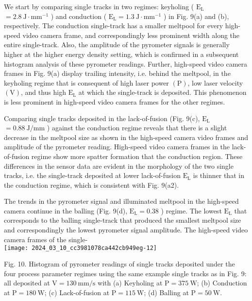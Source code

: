 \documentclass[10pt]{article}
\begin{document}
We start by comparing single tracks in two regimes: keyholing ( $\mathrm{E}_{\mathrm{L}}$ $=2.8 \mathrm{~J} \cdot \mathrm{mm}^{-1}$ ) and conduction ( $\mathrm{E}_{\mathrm{L}}=1.3 \mathrm{~J} \cdot \mathrm{mm}^{-1}$ ) in Fig. 9(a) and (b), respectively. The conduction single-track has a smaller meltpool for every high-speed video camera frame, and correspondingly less prominent width along the entire single-track. Also, the amplitude of the pyrometer signals is generally higher at the higher energy density setting, which is confirmed in a subsequent histogram analysis of these pyrometer readings. Further, high-speed video camera frames in Fig. 9(a) display trailing intensity, i.e. behind the meltpool, in the keyholing regime that is consequent of high laser power $(\mathrm{P})$, low laser velocity $(\mathrm{V})$, and thus high $\mathrm{E}_{\mathrm{L}}$ at which the single-track is deposited. This phenomenon is less prominent in high-speed video camera frames for the other regimes.

Comparing single tracks deposited in the lack-of-fusion (Fig. 9(c), $\mathrm{E}_{\mathrm{L}}$ $=0.88 \mathrm{~J} / \mathrm{mm}$ ) against the conduction regime reveals that there is a slight decrease in the meltpool size as shown in the high-speed camera video frames and amplitude of the pyrometer reading. High-speed video camera frames in the lack-of-fusion regime show more spatter formation that the conduction region. These differences in the sensor data are evident in the morphology of the two single tracks, i.e. the single-track deposited at lower lack-of-fusion $\mathrm{E}_{\mathrm{L}}$ is thinner that in the conduction regime, which is consistent with Fig. 9(a2).

The trends in the pyrometer signal and illuminated meltpool in the high-speed camera continue in the balling (Fig. 9(d), $\mathrm{E}_{\mathrm{L}}=0.38$ ) regime. The lowest $\mathrm{E}_{\mathrm{L}}$ that corresponds to the balling single-track that produced the smallest meltpool size and correspondingly the lowest pyrometer signal amplitude. The high-speed video camera frames of the single-\\
\texttt{[image: 2024\_03\_10\_cc3981078ca442cb949eg-12]}

Fig. 10. Histogram of pyrometer readings of single tracks deposited under the four process parameter regimes using the same example single tracks as in Fig. 9: all deposited at $\mathrm{V}=130 \mathrm{~mm} / \mathrm{s}$ with (a) Keyholing at $\mathrm{P}=375 \mathrm{~W}$; (b) Conduction at $\mathrm{P}=180 \mathrm{~W}$; (c) Lack-of-fusion at $\mathrm{P}=115 \mathrm{~W}$; (d) Balling at $\mathrm{P}=50 \mathrm{~W}$.
\end{document}
